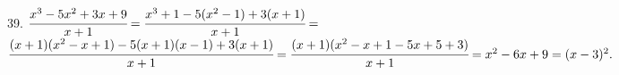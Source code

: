 39. $\cfrac{x^3-5x^2+3x+9}{x+1}=\cfrac{x^3+1-5(x^2-1)+3(x+1)}{x+1}=$\\$\cfrac{(x+1)(x^2-x+1)-5(x+1)(x-1)+3(x+1)}{x+1}=
\cfrac{(x+1)(x^2-x+1-5x+5+3)}{x+1}=x^2-6x+9=(x-3)^2.$\\
